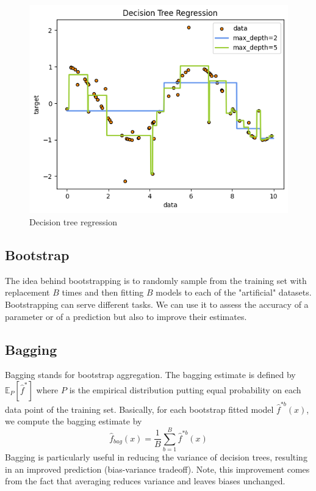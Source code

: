 \begin{figure}
    \includegraphics[width=\textwidth]{images/decision_tree.png}
    \caption{Decision tree regression}
    \label{fig:decision_tree}
\end{figure}
    
\subsection{Bootstrap}
The idea behind bootstrapping is to randomly sample from the training set with replacement $B$ times and then fitting $B$ models to each of the "artificial" datasets. Bootstrapping can serve different tasks. We can use it to assess the accuracy of a parameter %
or of a prediction but also to improve their estimates.

\subsection{Bagging}
Bagging stands for bootstrap aggregation. 
The bagging estimate is defined by $\mathbb{E}_P[\hat{f}^*]$ where $P$ is the empirical distribution putting equal probability on each data point of the training set.
Basically, for each bootstrap fitted model $\hat{f}^{*b}(x)$, we compute the bagging estimate by
\begin{equation}
    \hat{f}_{bag}(x)=\frac{1}{B}\sum\limits_{b=1}^{B}\hat{f}^{*b}(x)
\end{equation}
Bagging is particularly useful in reducing the variance of decision trees, resulting in an improved prediction (bias-variance tradeoff).
Note, this improvement comes from the fact that averaging reduces variance and leaves biases unchanged.

